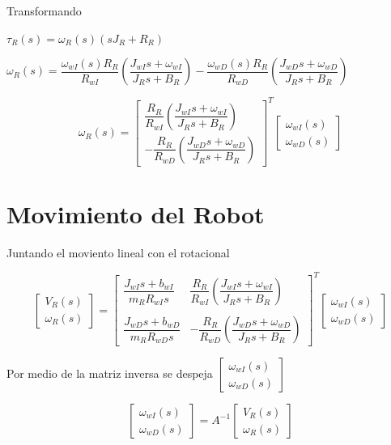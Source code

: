 Transformando

$\tau_{R}(s) = \omega_{R}(s)(sJ_{R} + R_{R})$

$\omega_{R}(s) = \dfrac{\omega_{wI}(s)R_{R}}{R_{wI}} \left( \dfrac{J_{wI}s + \omega_{wI}}{J_{R}s + B_{R}} \right) - \dfrac{\omega_{wD}(s)R_{R}}{R_{wD}} \left( \dfrac{J_{wD}s + \omega_{wD}}{J_{R}s + B_{R}} \right)$

\[
\omega_{R}(s) = 
\begin{bmatrix}
\dfrac{R_{R}}{R_{wI}}  \left( \dfrac{J_{wI}s + \omega_{wI}}{J_{R}s + B_{R}} \right) \\
-\dfrac{R_{R}}{R_{wD}} \left( \dfrac{J_{wD}s + \omega_{wD}}{J_{R}s + B_{R}} \right) 
\end{bmatrix}^{T} \begin{bmatrix}
\omega_{wI}(s) \\
\omega_{wD}(s)
\end{bmatrix}
\]


\section{Movimiento del Robot}

Juntando el moviento lineal con el rotacional


\[
\begin{bmatrix}
V_{R}(s) \\
\omega_{R}(s)
\end{bmatrix} = \begin{bmatrix}
\dfrac{J_{wI}s + b_{wI}}{m_{R}R_{wI}s} & \dfrac{R_{R}}{R_{wI}} \left( \dfrac{J_{wI}s + \omega_{wI}}{J_{R}s + B_{R}} \right) \\
                                       &    \\
\dfrac{J_{wD}s + b_{wD}}{m_{R}R_{wD}s} & -\dfrac{R_{R}}{R_{wD}} \left( \dfrac{J_{wD}s + \omega_{wD}}{J_{R}s + B_{R}} \right)
\end{bmatrix}^{T} \begin{bmatrix}
\omega_{wI}(s) \\
\omega_{wD}(s)
\end{bmatrix}
\]

Por medio de la matriz inversa se despeja 
$
\begin{bmatrix}
\omega_{wI}(s) \\
\omega_{wD}(s)
\end{bmatrix}
$

\[
\begin{bmatrix}
\omega_{wI}(s) \\
\omega_{wD}(s)
\end{bmatrix} = A^{-1} \begin{bmatrix}
V_{R}(s) \\
\omega_{R}(s)
\end{bmatrix}
\]

